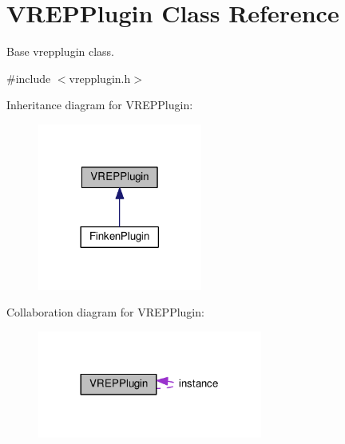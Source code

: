 \hypertarget{classVREPPlugin}{}\section{V\+R\+E\+P\+Plugin Class Reference}
\label{classVREPPlugin}


Base vrepplugin class.  




{\ttfamily \#include $<$vrepplugin.\+h$>$}



Inheritance diagram for V\+R\+E\+P\+Plugin\+:\nopagebreak
\begin{figure}[H]
\begin{center}
\leavevmode
\includegraphics[width=153pt]{classVREPPlugin__inherit__graph}
\end{center}
\end{figure}


Collaboration diagram for V\+R\+E\+P\+Plugin\+:\nopagebreak
\begin{figure}[H]
\begin{center}
\leavevmode
\includegraphics[width=209pt]{classVREPPlugin__coll__graph}
\end{center}
\end{figure}
